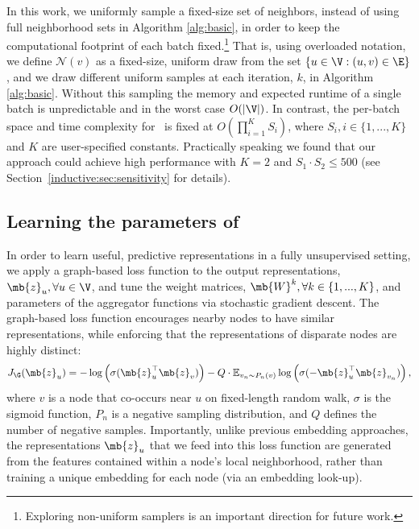 In this work, we uniformly sample a fixed-size set of neighbors, instead of using full neighborhood sets in Algorithm \ref{alg:basic}, in order to keep the computational footprint of each batch fixed.\footnote{Exploring non-uniform samplers is an important direction for future work.}
That is, using overloaded notation, we define $\mathcal{N}(v)$ as a fixed-size, uniform draw from the set $\{u \in \V : (u,v) \in \E\}$, and we draw different uniform samples at each iteration, $k$, in Algorithm \ref{alg:basic}. 
Without this sampling the memory and expected runtime of a single batch is unpredictable and in the worst case $O(|\V|)$.
In contrast, the per-batch space and time complexity for \name\ is fixed at $O(\prod_{i=1}^{K}S_i)$, where $S_i, i \in \{1,...,K\}$ and $K$ are user-specified constants.
Practically speaking we found that our approach could achieve high performance with $K=2$ and $S_1\cdot S_2 \leq 500$ (see Section~\ref{inductive:sec:sensitivity} for details).


\subsection{Learning the parameters of \name}\label{inductive:sec:learning}  
In order to learn useful, predictive representations in a fully unsupervised setting, we apply a graph-based loss function to the output representations, $\mb{z}_u, \forall u \in {\V}$, and tune the weight matrices, $\mb{W}^k, \forall k \in \{1,...,K\}$,  and parameters of the aggregator functions via stochastic gradient descent. 
The graph-based loss function encourages nearby nodes to have similar representations, while enforcing that the representations of disparate nodes are highly distinct:
\begin{equation}\label{eq:neg}
J_{\G}(\mb{z}_u) = -\log\left(\sigma(\mb{z}^\top_u\mb{z}_{v}) \right) - Q\cdot\mathbb{E}_{v_{n} \sim P_n(v)}\log\left(\sigma(-\mb{z}^\top_u\mb{z}_{v_{n}})\right),
\end{equation}
where $v$ is a node that co-occurs near $u$ on fixed-length random walk, $\sigma$ is the sigmoid function, $P_n$ is a negative sampling distribution, and $Q$ defines the number of negative samples. 
Importantly, unlike previous embedding approaches, the representations $\mb{z}_u$ that we feed into this loss function are generated from the features contained within a node's local neighborhood, rather than training a unique embedding for each node (via an embedding look-up). 

